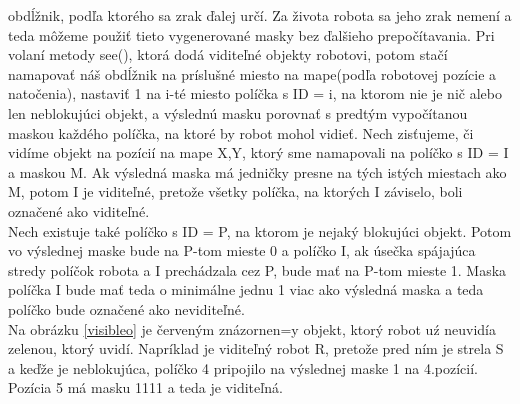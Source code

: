 obdĺžnik, podľa ktorého sa zrak ďalej určí.
Za života robota sa jeho zrak nemení a teda môžeme použiť tieto vygenerované masky bez ďalšieho prepočítavania. Pri volaní metody see(), ktorá dodá viditeľné objekty robotovi, potom stačí namapovať náš obdĺžnik na príslušné miesto na mape(podľa robotovej pozície a natočenia), nastaviť 1 na i-té miesto políčka s ID = i, na ktorom nie je nič alebo len neblokujúci objekt, a výslednú masku porovnať s predtým vypočítanou maskou každého políčka, na ktoré by robot mohol vidieť. Nech zisťujeme, či vidíme objekt na pozícií na mape X,Y, ktorý sme namapovali na políčko s ID = I a maskou M. Ak výsledná maska má jedničky presne na tých istých miestach ako M, potom I je viditeľné, pretože všetky políčka, na ktorých I záviselo, boli označené ako viditeľné. \\
Nech existuje také políčko s ID = P, na ktorom je nejaký blokujúci objekt. Potom vo výslednej maske bude na P-tom mieste 0 a políčko I, ak úsečka spájajúca stredy políčok robota a I prechádzala cez P, bude mať na P-tom mieste 1. Maska políčka I bude mať teda o minimálne jednu 1 viac ako výsledná maska a teda políčko bude označené ako neviditeľné.\\
Na obrázku \ref{visibleo} je červeným znázornen=y objekt, ktorý robot uź neuvidía zelenou, ktorý uvidí. Napríklad je viditeľný robot R, pretože pred ním je strela S a keďže je neblokujúca, políčko 4 pripojilo na výslednej maske 1 na 4.pozícií. Pozícia 5 má masku 1111 a teda je viditeľná.

